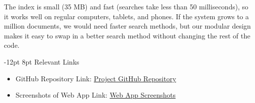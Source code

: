 \documentclass[10pt,twocolumn]{article}
\makeatletter
\renewcommand{\section}{\@startsection{section}{1}{\z@}%
  {-12pt \@plus -2pt \@minus -1pt}%
  {8pt \@plus 0.3pt}%
  {\normalfont\Large\bfseries}}
\renewcommand{\subsection}{\@startsection{subsection}{2}{\z@}%
  {-6pt \@plus -1pt \@minus -0.5pt}%
  {4pt \@plus 0.2pt}%
  {\normalfont\large\bfseries}}
\makeatother
\begin{document}
\begin{table}[ht]
\centering
\small
\caption{Speed of indexing on a regular computer.}
\label{tab:perf}
%
\end{table}

\smallskip\noindent The index is small (35 MB) and fast (searches take less than 50 milliseconds), so it works well on regular computers, tablets, and phones. If the system grows to a million documents, we would need faster search methods, but our modular design makes it easy to swap in a better search method without changing the rest of the code.

\section{Relevant Links}
\begin{itemize}
    \item GitHub Repository Link: \href{https://github.com/IIITH-2025-27/InfoBridge}{Project GitHub Repository}
    \item Screenshots of Web App Link: \href{https://github.com/IIITH-2025-27/InfoBridge/tree/main/screenshots}{Web App Screenshots}
\end{itemize}
\end{document}
